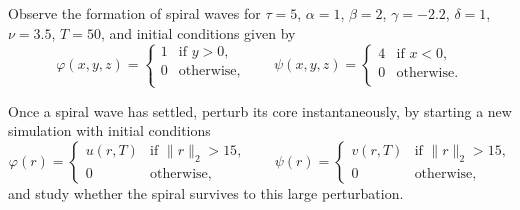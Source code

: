 \documentclass[a4paper]{siamonline220329}
\theoremstyle{plain}
\renewcommand\phi\varphi
\begin{document}
\begin{question}
  Observe the formation of spiral waves for $\tau = 5$, $\alpha =1$, $\beta =2$, $\gamma
  =-2.2$, $\delta =1$, $\nu = 3.5$, $T=50$, and initial conditions given by
  \[
    \phi(x,y,z) = 
    \begin{cases}
      1 & \text{if $y > 0$,} \\
      0 & \text{otherwise,} \\
    \end{cases}
    \qquad 
    \psi(x,y,z) = 
    \begin{cases}
      4 & \text{if $x < 0$,} \\
      0 & \text{otherwise.} \\
    \end{cases}
  \]

Once a spiral wave has settled, perturb its core instantaneously, by starting a new
simulation with initial conditions
\[
  \phi(r) = 
  \begin{cases}
    u(r,T) & \text{if $\| r \|_2  > 15$,} \\
    0      & \text{otherwise,} 
  \end{cases}
  \qquad 
  \psi(r) = 
  \begin{cases}
    v(r,T) & \text{if $\| r \|_2  > 15$,} \\
    0      & \text{otherwise,} 
  \end{cases}
\]
and study whether the spiral survives to this large perturbation.
\end{question}



\end{document}
